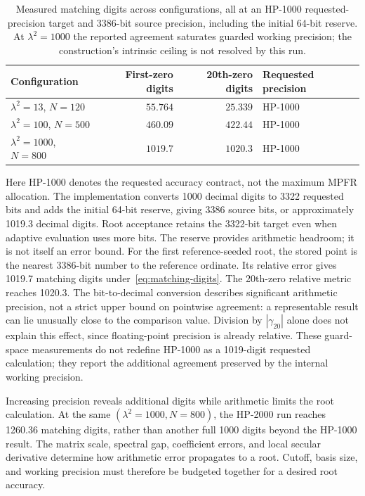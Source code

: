 \documentclass[11pt,a4paper]{article}
\begin{document}
\begin{table}[!htbp]
\centering
\caption{Measured matching digits across configurations, all at an
HP-1000 requested-precision target and 3386-bit source precision,
including the initial 64-bit reserve.
At $\lambda^2{=}1000$ the reported agreement saturates guarded working
precision; the construction's intrinsic ceiling is not resolved by this
run.}
\label{tab:headline}
\begin{tabular}{@{}lrrl@{}}
\toprule
Configuration & First-zero digits & 20th-zero digits & Requested precision \\
\midrule
$\lambda^2{=}13$,   $N{=}120$ & $55.764$  & $25.339$   & HP-1000 \\
$\lambda^2{=}100$,  $N{=}500$ & $460.09$ & $422.44$  & HP-1000 \\
$\lambda^2{=}1000$, $N{=}800$ & $\mathbf{1019.7}$ & $\mathbf{1020.3}$ & HP-1000 \\
\bottomrule
\end{tabular}
\end{table}

Here HP-1000 denotes the requested accuracy contract, not the maximum
MPFR allocation. The implementation converts 1000 decimal digits to 3322
requested bits and adds the initial 64-bit reserve, giving 3386 source
bits, or approximately 1019.3 decimal digits. Root acceptance retains
the 3322-bit target even when adaptive evaluation uses more bits.
The reserve provides arithmetic headroom; it is not itself an error
bound. For the first reference-seeded root, the stored point is the
nearest 3386-bit number to the reference ordinate. Its relative error gives 1019.7
matching digits under~\eqref{eq:matching-digits}. The 20th-zero relative
metric reaches 1020.3. The bit-to-decimal conversion
describes significant arithmetic precision, not a strict upper bound on
pointwise agreement: a representable result can lie unusually close to
the comparison value. Division by $|\gamma_{20}|$ alone does not
explain this effect, since floating-point precision is already relative. These guard-space measurements do not
redefine HP-1000 as a 1019-digit requested calculation; they report the
additional agreement preserved by the internal working precision.

Increasing precision reveals additional digits while arithmetic
limits the root calculation. At the same
$(\lambda^2{=}1000,N{=}800)$, the HP-2000 run reaches 1260.36 matching
digits, rather than another full 1000 digits beyond the HP-1000 result.
The matrix scale, spectral gap, coefficient errors, and local secular
derivative determine how arithmetic error propagates to a root.
Cutoff, basis size, and working precision must therefore be budgeted
together for a desired root accuracy.
\end{document}
